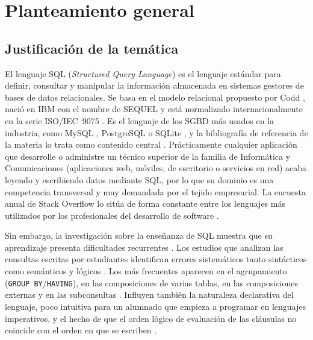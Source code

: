 \documentclass[11pt,a4paper]{article}
\begin{document}
\tableofcontents
\newpage

\section{Planteamiento general}

\subsection{Justificación de la temática}

El lenguaje SQL (\emph{Structured Query Language}) es el lenguaje estándar para definir,
consultar y manipular la información almacenada en sistemas gestores de bases de datos
relacionales. Se basa en el modelo relacional propuesto por Codd \cite{codd1970}, nació en
IBM con el nombre de SEQUEL \cite{chamberlin1974} y está normalizado internacionalmente en
la serie ISO/IEC~9075 \cite{iso9075}. Es el lenguaje de los SGBD más usados en la industria,
como MySQL \cite{mysqldoc}, PostgreSQL \cite{postgresdoc} o SQLite \cite{sqlitedoc}, y la
bibliografía de referencia de la materia lo trata como contenido central
\cite{silberschatz,elmasri}. Prácticamente cualquier aplicación que desarrolle o administre un técnico
superior de la familia de Informática y Comunicaciones (aplicaciones web, móviles, de
escritorio o servicios en red) acaba leyendo y escribiendo datos mediante SQL, por lo que
su dominio es una competencia transversal y muy demandada por el tejido empresarial. La
encuesta anual de Stack Overflow lo sitúa de forma constante entre los lenguajes más
utilizados por los profesionales del desarrollo de software \cite{stackoverflow2025}.

Sin embargo, la investigación sobre la enseñanza de SQL muestra que su aprendizaje presenta
dificultades recurrentes \cite{taipalus2020}. Los estudios que analizan las consultas
escritas por estudiantes identifican errores sistemáticos tanto sintácticos como
semánticos y lógicos \cite{taipalus2018}. Los más frecuentes aparecen en el agrupamiento
(\texttt{GROUP BY}/\texttt{HAVING}), en las composiciones de varias tablas, en las
composiciones externas y en las subconsultas \cite{ahadi2016,taipalus2018}. Influyen
también la naturaleza declarativa del lenguaje, poco intuitiva para un alumnado que empieza a
programar en lenguajes imperativos, y el hecho de que el orden lógico de evaluación de las
cláusulas no coincide con el orden en que se escriben \cite{taipalus2018}.
\end{document}
